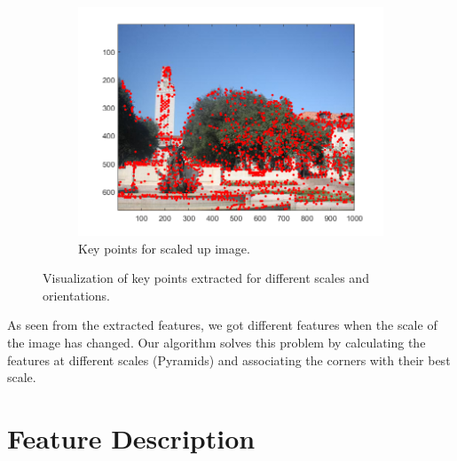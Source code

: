\documentclass{article}
\begin{document}
\begin{figure}[!htb]
\begin{subfigure}{.9\textwidth}
  \includegraphics[width=.99\textwidth]{uttower2_scaledup_keypoints.png}
  \caption{Key points for scaled up image.}
\end{subfigure}
\caption{Visualization of key points extracted for different scales and orientations.}
\end{figure}

As seen from the extracted features, we got different features when the scale of the image has changed. Our algorithm solves this problem by calculating the features at different scales (Pyramids) and associating the corners with their best scale.

\newpage

\section{Feature Description}
\end{document}

